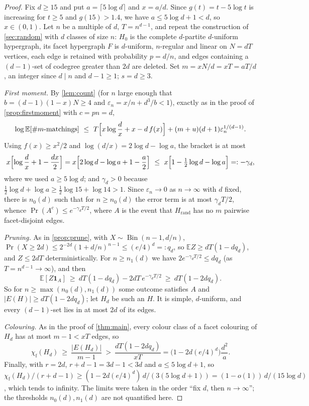 \documentclass[11pt,a4paper]{article}
\theoremstyle{plain}
\theoremstyle{definition}
\theoremstyle{remark}
\newcommand{\E}{\mathbb E}
\newcommand{\chif}{\chi_{\mathrm{f}}}
\newcommand{\Hrand}{H_{\mathrm{rand}}}
\newcommand{\ind}{\mathbf 1}
\DeclareMathOperator{\Bin}{Bin}
\begin{document}
\label{pf:large}
\thmlarge*
\begin{proof}
Fix $d\ge15$ and put $a=\lceil5\log d\rceil$ and $x=a/d$. Since $g(t)=t-5\log t$ is increasing for $t\ge5$ and $g(15)>1.4$, we have $a\le5\log d+1<d$, so $x\in(0,1)$. Let $n$ be a multiple of $d$, $T=n^{d-1}$, and repeat the construction of \cref{sec:random} with $d$ classes of size $n$: $H_0$ is the complete $d$-partite $d$-uniform hypergraph, its facet hypergraph $F$ is $d$-uniform, $n$-regular and linear on $N=dT$ vertices, each edge is retained with probability $p=d/n$, and edges containing a $(d-1)$-set of codegree greater than $2d$ are deleted. Set $m=xN/d=xT=aT/d$, an integer since $d\mid n$ and $d-1\ge1$; $s=d\ge3$.

\emph{First moment.} By \cref{lem:count} (for $n$ large enough that $b=(d-1)(1-x)N\ge4$ and $\varepsilon_n=x/n+d^3/b<1$), exactly as in the proof of \cref{prop:firstmoment} with $c=pn=d$,
\[
\log\E[\#\text{$m$-matchings}]\ \le\ T\Bigl[x\log\frac dx+x-d\,f(x)\Bigr]+(m+u)(d+1)\varepsilon_n^{1/(d-1)} .
\]
Using $f(x)\ge x^2/2$ and $\log(d/x)=2\log d-\log a$, the bracket is at most
\[
x\Bigl[\log\frac dx+1-\frac{dx}2\Bigr]=x\Bigl[2\log d-\log a+1-\frac a2\Bigr]\ \le\ x\Bigl[1-\tfrac12\log d-\log a\Bigr]=:-\gamma_d ,
\]
where we used $a\ge5\log d$; and $\gamma_d>0$ because $\tfrac12\log d+\log a\ge\tfrac12\log15+\log14>1$. Since $\varepsilon_n\to0$ as $n\to\infty$ with $d$ fixed, there is $n_0(d)$ such that for $n\ge n_0(d)$ the error term is at most $\gamma_dT/2$, whence $\Pr(A^c)\le e^{-\gamma_dT/2}$, where $A$ is the event that $\Hrand$ has no $m$ pairwise facet-disjoint edges.

\emph{Pruning.} As in \cref{prop:prune}, with $X\sim\Bin(n-1,d/n)$, $\Pr(X\ge2d)\le2^{-2d}(1+d/n)^{n-1}\le(e/4)^d=:q_d$, so $\E Z\ge dT(1-dq_d)$, and $Z\le2dT$ deterministically. For $n\ge n_1(d)$ we have $2e^{-\gamma_dT/2}\le dq_d$ (as $T=n^{d-1}\to\infty$), and then
\[
\E[Z\ind_A]\ \ge\ dT(1-dq_d)-2dT\,e^{-\gamma_dT/2}\ \ge\ dT(1-2dq_d).
\]
So for $n\ge\max(n_0(d),n_1(d))$ some outcome satisfies $A$ and $|E(H)|\ge dT(1-2dq_d)$; let $H_d$ be such an $H$. It is simple, $d$-uniform, and every $(d-1)$-set lies in at most $2d$ of its edges.

\emph{Colouring.} As in the proof of \cref{thm:main}, every colour class of a facet colouring of $H_d$ has at most $m-1<xT$ edges, so
\[
\chif(H_d)\ \ge\ \frac{|E(H_d)|}{m-1}\ >\ \frac{dT(1-2dq_d)}{xT}=\bigl(1-2d(e/4)^d\bigr)\frac{d^2}{a} .
\]
Finally, with $r=2d$, $r+d-1=3d-1<3d$ and $a\le5\log d+1$, so $\chif(H_d)/(r+d-1)\ge(1-2d(e/4)^d)\,d/(3(5\log d+1))=(1-o(1))\,d/(15\log d)$, which tends to infinity. The limits were taken in the order ``fix $d$, then $n\to\infty$''; the thresholds $n_0(d),n_1(d)$ are not quantified here.
\end{proof}
\end{document}
